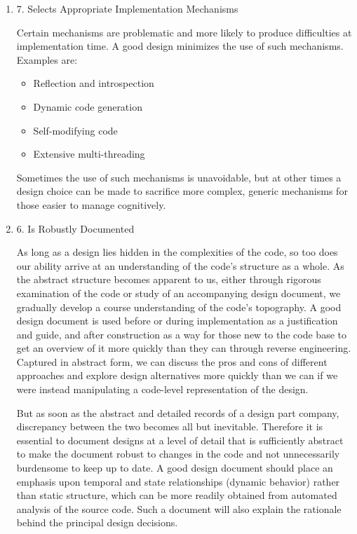 \documentclass{article}
\begin{document}
\begin{enumerate}
\item 7. Selects Appropriate Implementation Mechanisms
\label{sec:orgheadline240}

Certain mechanisms are problematic and more likely to produce
difficulties at implementation time. A good design minimizes the use of
such mechanisms. Examples are:

\begin{itemize}
\item Reflection and introspection
\item Dynamic code generation
\item Self-modifying code
\item Extensive multi-threading
\end{itemize}

Sometimes the use of such mechanisms is unavoidable, but at other times
a design choice can be made to sacrifice more complex, generic
mechanisms for those easier to manage cognitively.

\item 6. Is Robustly Documented
\label{sec:orgheadline241}

As long as a design lies hidden in the complexities of the code, so too
does our ability arrive at an understanding of the code's structure as a
whole. As the abstract structure becomes apparent to us, either through
rigorous examination of the code or study of an accompanying design
document, we gradually develop a course understanding of the code's
topography. A good design document is used before or during
implementation as a justification and guide, and after construction as a
way for those new to the code base to get an overview of it more quickly
than they can through reverse engineering. Captured in abstract form, we
can discuss the pros and cons of different approaches and explore design
alternatives more quickly than we can if we were instead manipulating a
code-level representation of the design.

But as soon as the abstract and detailed records of a design part
company, discrepancy between the two becomes all but inevitable.
Therefore it is essential to document designs at a level of detail that
is sufficiently abstract to make the document robust to changes in the
code and not unnecessarily burdensome to keep up to date. A good design
document should place an emphasis upon temporal and state relationships
(dynamic behavior) rather than static structure, which can be more
readily obtained from automated analysis of the source code. Such a
document will also explain the rationale behind the principal design
decisions.


\end{enumerate}
\end{document}
